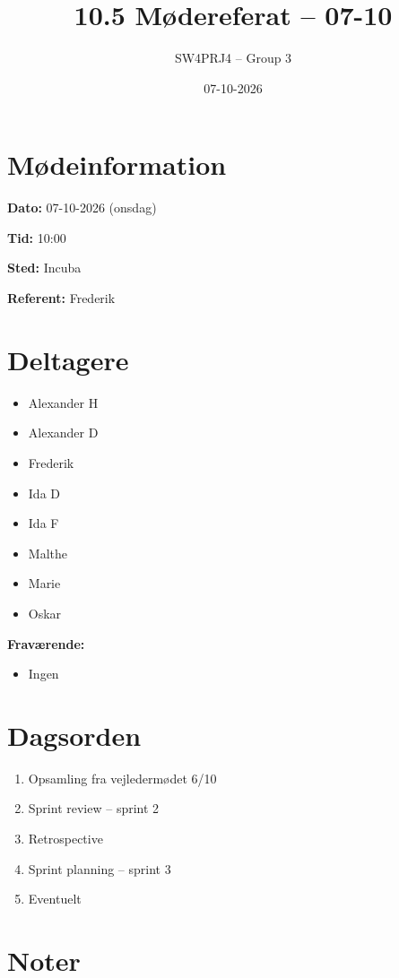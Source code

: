 \documentclass[a4paper,11pt]{article}
\title{10.5 Mødereferat -- 07-10}
\author{SW4PRJ4 -- Group 3}
\date{07-10-2026}
\begin{document}
\maketitle

\section*{Mødeinformation}

\textbf{Dato:} 07-10-2026 (onsdag)

\textbf{Tid:} 10:00

\textbf{Sted:} Incuba

\textbf{Referent:} Frederik

\section*{Deltagere}

\begin{itemize}
    \item Alexander H
    \item Alexander D
    \item Frederik
    \item Ida D
    \item Ida F
    \item Malthe
    \item Marie
    \item Oskar
\end{itemize}

\textbf{Fraværende:}

\begin{itemize}
    \item Ingen
\end{itemize}

\section*{Dagsorden}

\begin{enumerate}
    \item Opsamling fra vejledermødet 6/10
    \item Sprint review -- sprint 2
    \item Retrospective
    \item Sprint planning -- sprint 3
    \item Eventuelt
\end{enumerate}

\section*{Noter}
\end{document}
